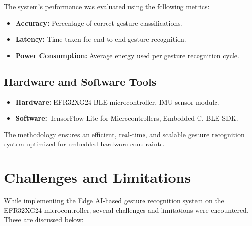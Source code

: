 \documentclass[
  9pt,
  letterpaper,
  abstract,
  titlepage]{scrbook}
\begin{document}
The system's performance was evaluated using the following metrics:

\begin{itemize}
\item
  \textbf{Accuracy:} Percentage of correct gesture classifications.
\item
  \textbf{Latency:} Time taken for end-to-end gesture recognition.
\item
  \textbf{Power Consumption:} Average energy used per gesture
  recognition cycle.
\end{itemize}

\subsection{Hardware and Software
Tools}\label{hardware-and-software-tools}

\begin{itemize}
\item
  \textbf{Hardware:} EFR32XG24 BLE microcontroller, IMU sensor module.
\item
  \textbf{Software:} TensorFlow Lite for Microcontrollers, Embedded C,
  BLE SDK.
\end{itemize}

The methodology ensures an efficient, real-time, and scalable gesture
recognition system optimized for embedded hardware constraints.

\section{Challenges and Limitations}\label{sec:challenges}

While implementing the Edge AI-based gesture recognition system on the
EFR32XG24 microcontroller, several challenges and limitations were
encountered. These are discussed below:
\end{document}
